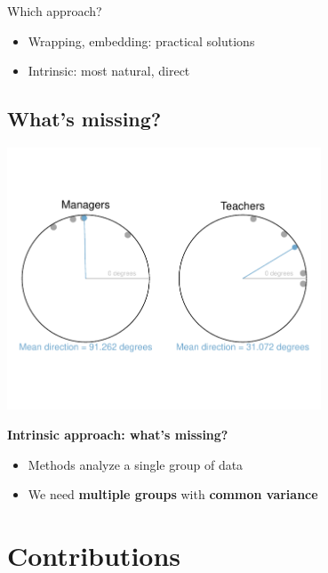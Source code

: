\documentclass{beamer}
\begin{document}
\begin{frame}
Which approach?
\begin{itemize}
\item Wrapping, embedding: practical solutions
\item Intrinsic: most natural, direct
\end{itemize}

\end{frame}




\subsection{What's missing?}


\begin{frame}
\begin{center}

\includegraphics[width=0.7\textwidth, clip=true, trim=0.4cm 2cm 0.4cm 2cm]{ManagersTeachers.pdf}
\vspace{0.5cm}

\textbf{Intrinsic approach: what's missing?}
\begin{itemize}
\item Methods analyze a single group of data
\pause
\item We need \textbf{multiple groups} \pause with \textbf{common variance}

\end{itemize}

\end{center}
\end{frame}



\section{Contributions}
\end{document}
